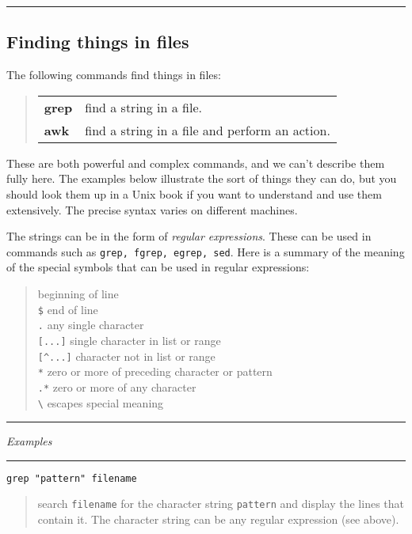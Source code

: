 \documentclass[twoside,11pt,nolof]{starlink}
\providecommand{\example}[2]{\goodbreak
                         \texttt{#1}
                         \vspace*{-4mm}
                         \begin{quote}
                           {\small #2}
                         \end{quote}
                        }
\providecommand{\exbegin}{\begin{center}
                      \rule{18mm}{0.3mm}
                      \emph{Examples}
                      \rule{18mm}{0.3mm}
                      \end{center}
                     }
\providecommand{\exend}{\begin{center}
                    \rule{50mm}{0.3mm}
                    \end{center}
                   }
\begin{document}
\exend

\subsection{Finding things in files}

The following commands find things in files:

\begin{quote}
\begin{tabular}{lp{67mm}}

\textbf{grep}  & find a string in a file.\\
\textbf{awk}   & find a string in a file and perform an action.

\end{tabular}
\end{quote}

These are both powerful and complex commands, and we can't describe them fully
here.
The examples below illustrate the sort of things they can do, but you should
look them up in a Unix book if you want to understand and use them extensively.
The precise syntax varies on different machines.

The strings can be in the form of \emph{regular expressions}.
These can be used in commands such as \texttt{grep, fgrep, egrep, sed}.
Here is a summary of the meaning of the special symbols that can be used
in regular expressions:
\begin{quote}
\texttt{\wedge} \hfill beginning of line \\
\texttt{\$} \hfill end of line \\
\texttt{.} \hfill any single character \\
\texttt{[...]} \hfill single character in list or range \\
\verb+[^...]+ \hfill character not in list or range \\
\texttt{*} \hfill zero or more of preceding character or pattern \\
\texttt{.*} \hfill zero or more of any character \\
\verb+\+ \hfill escapes special meaning
\end {quote}

\goodbreak

\exbegin

\example{grep "pattern" filename}
{search \texttt{filename} for the character string \texttt{pattern} and display the
lines that contain it.
The character string can be any regular expression (see above).}
\end{document}
